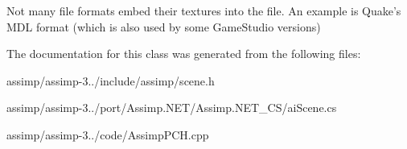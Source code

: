 Not many file formats embed their textures into the file. An example is Quake's M\+D\+L format (which is also used by some Game\+Studio versions) 

The documentation for this class was generated from the following files\+:\begin{DoxyCompactItemize}
\item 
assimp/assimp-\/3../include/assimp/scene.\+h\item 
assimp/assimp-\/3../port/\+Assimp.\+N\+E\+T/\+Assimp.\+N\+E\+T\+\_\+\+C\+S/ai\+Scene.\+cs\item 
assimp/assimp-\/3../code/Assimp\+P\+C\+H.\+cpp\end{DoxyCompactItemize}
